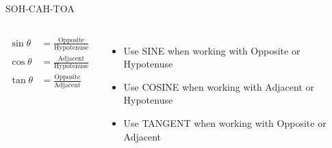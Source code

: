 \documentclass[aspectratio=169]{beamer}
\begin{document}
\begin{frame}{SOH-CAH-TOA}
    \begin{tcolorbox}[colback=lightgray,colframe=accent,title=Trigonometric Ratios]
        \footnotesize
        \begin{columns}
            \begin{align*}
                \sin \theta &= \frac{\text{Opposite}}{\text{Hypotenuse}} \\
                \cos \theta &= \frac{\text{Adjacent}}{\text{Hypotenuse}} \\
                \tan \theta &= \frac{\text{Opposite}}{\text{Adjacent}}
            \end{align*}
            \begin{itemize}
                \item Use SINE when working with Opposite or Hypotenuse
                \item Use COSINE when working with Adjacent or Hypotenuse
                \item Use TANGENT when working with Opposite or Adjacent
            \end{itemize}
        \end{columns}
    \end{tcolorbox}
\end{frame}
\end{document}
